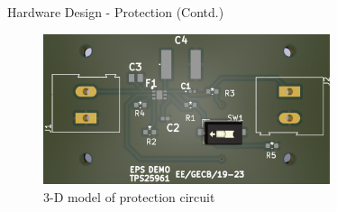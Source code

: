 \documentclass[aspectratio=169]{beamer}
\begin{document}
		\begin{frame}{Hardware Design - Protection (Contd.) }
			\begin{figure}[h]
				\centering
				\includegraphics[width=0.75\textwidth]{diag/prot_circ_3d.png}
				\caption{3-D model of protection circuit}
				\label{fig:mesh1}
			\end{figure}
		\end{frame}
		
			
				
		
				
				
\end{document}
